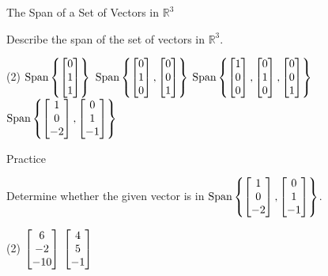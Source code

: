 \documentclass[xcolor=dvipsnames,aspectratio=169,t]{beamer}
\begin{document}
\begin{frame}{The Span of a Set of Vectors in $\mathbb{R}^3$}

  Describe the span of the set of vectors in $\mathbb{R}^3$.
  \bigskip
  
  \begin{tasks}(2)
 \task $\displaystyle \mbox{Span} \left\{ \begin{bmatrix} 0 \\ 1 \\ 1 \end{bmatrix} \right\}$  
 \task $\displaystyle \mbox{Span} \left\{ \begin{bmatrix} 0 \\ 1 \\ 0 \end{bmatrix} , \begin{bmatrix} 0 \\ 0 \\ 1 \end{bmatrix} \right\}$  \vspace{0.7in}
 \task $\displaystyle \mbox{Span} \left\{  \begin{bmatrix} 1 \\ 0 \\ 0 \end{bmatrix} , \begin{bmatrix} 0 \\ 1 \\ 0 \end{bmatrix} , \begin{bmatrix} 0 \\ 0 \\ 1 \end{bmatrix} \right\}$ 
 \task $\displaystyle \mbox{Span} \left\{ \begin{bmatrix} 1 \\ 0 \\ -2  \end{bmatrix},  \begin{bmatrix} 0 \\ 1 \\ -1  \end{bmatrix} \right\}$  
\end{tasks}

\vspace{1.5in}

\end{frame}

\begin{frame}{Practice}

  Determine whether the given vector is in $ \mbox{Span} \left\{ \begin{bmatrix} 1 \\ 0 \\ -2  \end{bmatrix},  \begin{bmatrix} 0 \\ 1 \\ -1  \end{bmatrix} \right\}$.
  \bigskip

  \begin{tasks}(2)
    \task $\displaystyle \begin{bmatrix} 6 \\ -2 \\ -10 \end{bmatrix}$
    \task $\displaystyle \begin{bmatrix} 4 \\ 5 \\ -1 \end{bmatrix}$
  \end{tasks}

\vspace{3in}
  
\end{frame}
\end{document}
